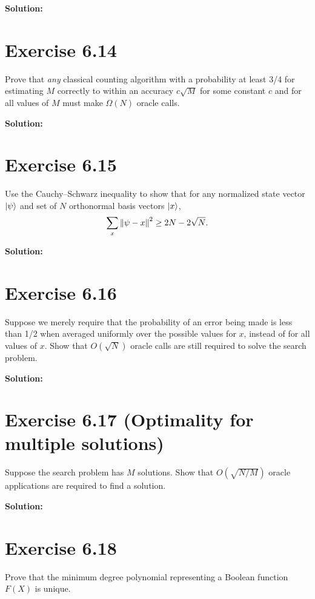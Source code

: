 \documentclass{book}
\begin{document}
        \textbf{Solution:}
    
    \section*{Exercise 6.14}
        Prove that \emph{any} classical counting algorithm with a probability at least 3/4 for estimating $M$ correctly to within an accuracy $c\sqrt{M}$ for some constant $c$ and for all values of $M$ must make $\Omega (N)$ oracle calls. 
        
        \textbf{Solution:}
    
    \section*{Exercise 6.15}
        Use the Cauchy–Schwarz inequality to show that for any normalized state vector $\ket{\psi}$ and set of $N$ orthonormal basis vectors $\ket{x}$,
        \begin{align}
            \sum_x \norm{\psi -x}^2 \geq 2N-2\sqrt{N}.
        \end{align}
        
        \textbf{Solution:}
        
    \section*{Exercise 6.16}
        Suppose we merely require that the probability of an error being made is less than 1/2 when averaged uniformly over the possible values for $x$, instead of for all values of $x$. Show that $O(\sqrt{N})$ oracle calls are still required to solve the search problem. 
        
        \textbf{Solution:}
        
    \section*{Exercise 6.17 (Optimality for multiple solutions)}
        Suppose the search problem has $M$ solutions. Show that $O(\sqrt{N/M})$ oracle applications are required to find a solution. 
        
        \textbf{Solution:}
        
    \section*{Exercise 6.18}
        Prove that the minimum degree polynomial representing a Boolean function $F(X)$ is unique. 
        
\end{document}
